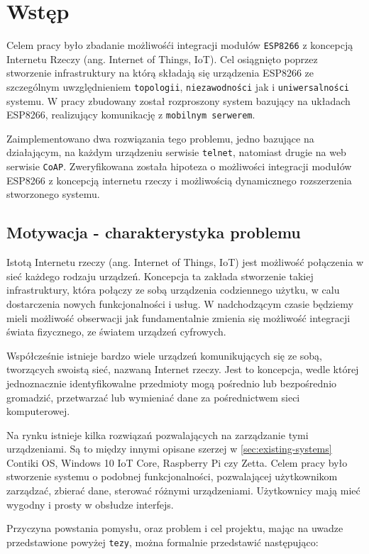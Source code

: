 \section{Wstęp}
\label{sec:wstep}
Celem pracy było zbadanie możliwośći integracji modułów \texttt{ESP8266} z koncepcją  Internetu Rzeczy (ang. Internet of Things, IoT). Cel osiągnięto poprzez stworzenie infrastruktury na którą składają się urządzenia ESP8266 ze szczególnym uwzględnieniem \texttt{topologii}, \texttt{niezawodności} jak i \texttt{uniwersalności} systemu. W pracy zbudowany został rozproszony system bazujący na układach ESP8266, realizujący komunikację z \texttt{mobilnym serwerem}.

Zaimplementowano dwa rozwiązania tego problemu, jedno bazujące na działającym, na każdym urządzeniu serwisie \texttt{telnet}, natomiast drugie na web serwisie \texttt{CoAP}. Zweryfikowana została hipoteza o możliwości integracji modułów ESP8266 z koncepcją internetu rzeczy i możliwością dynamicznego rozszerzenia stworzonego systemu.

\subsection{Motywacja - charakterystyka problemu}
Istotą Internetu rzeczy (ang. Internet of Things, IoT) jest możliwość połączenia w sieć każdego rodzaju urządzeń. Koncepcja ta zakłada stworzenie takiej infrastruktury, która połączy ze sobą urządzenia codziennego użytku, w calu dostarczenia nowych funkcjonalności i usług. W nadchodzącym czasie będziemy mieli możliwość obserwacji jak fundamentalnie zmienia się możliwość integracji świata fizycznego, ze światem urządzeń cyfrowych. 

Współcześnie istnieje bardzo wiele urządzeń komunikujących się ze sobą, tworzących swoistą sieć, nazwaną Internet rzeczy\cite{iot-art}. Jest to koncepcja, wedle której jednoznacznie identyfikowalne przedmioty mogą pośrednio lub bezpośrednio gromadzić, przetwarzać lub wymieniać dane za pośrednictwem sieci komputerowej. 

Na rynku istnieje kilka rozwiązań pozwalających na zarządzanie tymi urządzeniami. Są to między innymi opisane szerzej w \autoref{sec:existing-systems} Contiki OS, Windows 10 IoT Core, Raspberry Pi czy Zetta. Celem pracy było stworzenie systemu o podobnej funkcjonalności, pozwalającej użytkownikom zarządzać, zbierać dane, sterować różnymi urządzeniami. Użytkownicy mają mieć wygodny i prosty w obsłudze interfejs. 

Przyczyna powstania pomysłu, oraz problem i cel projektu, mając na uwadze przedstawione powyżej \texttt{tezy}, można formalnie przedstawić następująco:

